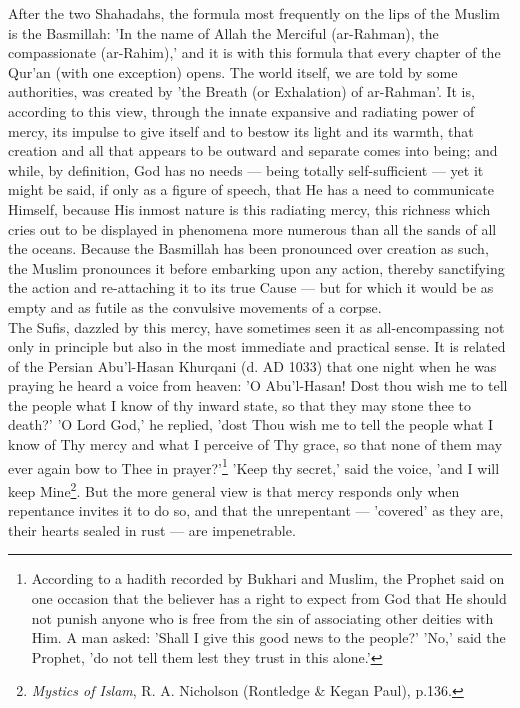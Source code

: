 \documentclass[11pt, b5paper, twoside]{book}
\begin{document}
After the two Shahadahs, the formula most frequently on the lips of the Muslim is the Basmillah: 'In 
the name of Allah the Merciful (ar-Rahman), the compassionate (ar-Rahim),' and it is with this 
formula that every chapter of the Qur'an (with one exception) opens. The world itself, we are told by 
some authorities, was created by 'the Breath (or Exhalation) of ar-Rahman'. It is, according to this 
view, through the innate expansive and radiating power of mercy, its impulse to give itself and to 
bestow its light and its warmth, that creation and all that appears to be outward and separate comes 
into being; and while, by definition, God has no needs --- being totally self-sufficient --- yet it might 
be said, if only as a figure of speech, that He has a need to communicate Himself, because His inmost 
nature is this radiating mercy, this richness which cries out to be displayed in phenomena more 
numerous than all the sands of all the oceans. Because the Basmillah has been pronounced over 
creation as such, the Muslim pronounces it before embarking upon any action, thereby sanctifying the 
action and re-attaching it to its true Cause --- but for which it would be as empty and as futile as 
the convulsive movements of a corpse. \\

The Sufis, dazzled by this mercy, have sometimes seen it as all-encompassing not only in principle 
but also in the most immediate and practical sense. It is related of the Persian Abu'l-Hasan Khurqani 
(d. AD 1033) that one night when he was praying he heard a voice from heaven: 'O Abu'l-Hasan! Dost 
thou wish me to tell the people what I know of thy inward state, so that they may stone thee to 
death?' 'O Lord God,' he replied, 'dost Thou wish me to tell the people what I know of Thy mercy and 
what I perceive of Thy grace, so that none of them may ever again bow to Thee in prayer?'\footnote{According to a hadith recorded by Bukhari and Muslim, the Prophet said on one occasion that the believer has a right to expect from God that He should not punish anyone who is free from the sin of associating other deities with Him. A man asked: 'Shall I give this good news to the people?' 'No,' 
said the Prophet, 'do not tell them lest they trust in this alone.'} 'Keep thy secret,' said the voice, 'and I will keep Mine\footnote{\emph{Mystics of Islam}, R. A. Nicholson (Rontledge \& Kegan Paul), p.136.}. But the more general view is that mercy responds only when repentance invites it to do so, and that the unrepentant --- 'covered' as they are, their hearts sealed in rust --- are impenetrable. \\
\end{document}
